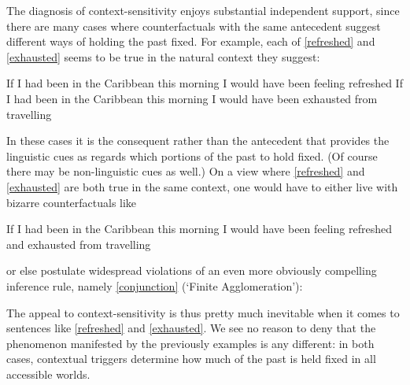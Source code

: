 \documentclass[If.tex]{subfiles}
\begin{document}
The diagnosis of context-sensitivity enjoys substantial independent support, since there are many cases where counterfactuals with the same antecedent suggest different ways of holding the past fixed. For example, each of \ref{refreshed} and \ref{exhausted} seems to be true in the natural context they suggest:
\begin{prop}\nitem
	\begin{prop}
		\aitem \label{refreshed}
			If I had been in the Caribbean this morning I would have been feeling refreshed
		\aitem \label{exhausted}
			If I had been in the Caribbean this morning I would have been exhausted from travelling
	\end{prop}
\end{prop}
In these cases it is the consequent rather than the antecedent that provides the linguistic cues as regards which portions of the past to hold fixed.
(Of course there may be non-linguistic cues as well.) On a view where \ref{refreshed} and \ref{exhausted} are both true in the same context, one would have to either live with bizarre counterfactuals like
\begin{prop}
	\nitem \label{refreshedexhausted}
		If I had been in the Caribbean this morning I would have been feeling refreshed and exhausted from travelling
\end{prop}
or else postulate widespread violations of an even more obviously compelling inference rule, namely \ref{conjunction} (‘Finite Agglomeration’):
\begin{prop}  
	\litem[CC] \label{conjunction}
\end{prop}
The appeal to context-sensitivity is thus pretty much inevitable when it comes to sentences like \ref{refreshed} and \ref{exhausted}. We see no reason to deny that the phenomenon manifested by the previously examples is any different: in both cases, contextual triggers determine how much of the past is held fixed in all accessible worlds.
\end{document}

